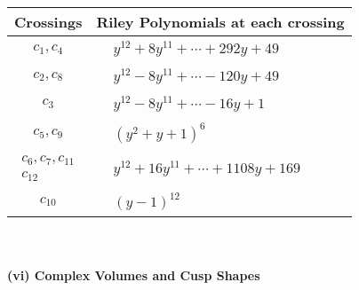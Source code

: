 \documentclass[1p]{elsarticle_modified}
\theoremstyle{definition}
\begin{document}
\begin{tabular}{m{50pt}|m{274pt}}
Crossings & \hspace{64pt}Riley Polynomials at each crossing \\
\hline $$\begin{aligned}c_{1},c_{4}\end{aligned}$$&$\begin{aligned}
&y^{12}+8 y^{11}+\cdots+292 y+49
\end{aligned}$\\
\hline $$\begin{aligned}c_{2},c_{8}\end{aligned}$$&$\begin{aligned}
&y^{12}-8 y^{11}+\cdots-120 y+49
\end{aligned}$\\
\hline $$\begin{aligned}c_{3}\end{aligned}$$&$\begin{aligned}
&y^{12}-8 y^{11}+\cdots-16 y+1
\end{aligned}$\\
\hline $$\begin{aligned}c_{5},c_{9}\end{aligned}$$&$\begin{aligned}
&(y^2+y+1)^6
\end{aligned}$\\
\hline $$\begin{aligned}c_{6},c_{7},c_{11}\\c_{12}\end{aligned}$$&$\begin{aligned}
&y^{12}+16 y^{11}+\cdots+1108 y+169
\end{aligned}$\\
\hline $$\begin{aligned}c_{10}\end{aligned}$$&$\begin{aligned}
&(y-1)^{12}
\end{aligned}$\\
\hline
\end{tabular}\\~\\
\newpage\flushleft \textbf{(vi) Complex Volumes and Cusp Shapes}
\end{document}
